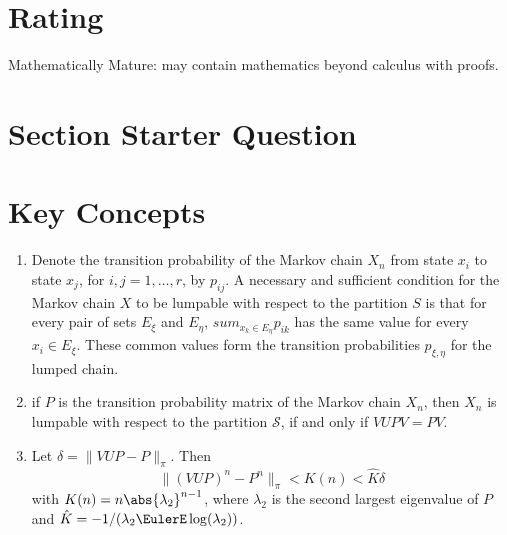 \documentclass[12pt]{article}
\begin{document}
\myheader
\mytitle

\hr


\hr

\usefirefox

\hr



\section*{Rating} %
Mathematically Mature: may contain mathematics beyond calculus with proofs.

\hr

\section*{Section Starter Question}

\hr

\section*{Key Concepts}

\begin{enumerate}
  \item Denote the transition probability
of the Markov chain $X_n$ from state $x_i$ to state $x_j$, for \( i, j
= 1, \dots,  r\), by \( p_{ij} \).  A 
necessary and sufficient condition for the Markov chain $X$ to be lumpable
with respect to the partition $S$ is that for every pair of sets
$E_{\xi}$ and $E_{\eta}$, \( sum_{x_k \in E_{\eta}} p_{ik} \) has the
same value for every \(x_i \in E_{\xi} \). These common values form
the transition probabilities $p_{\xi, \eta}$ for the lumped chain.
  \item   if $P$ is the transition probability matrix of the Markov chain
$X_n$, then $X_n$ is lumpable with respect to the partition $\mathcal{S}$, if and only if
\( VUPV = PV \).
  \item   Let $ \delta = \| VUP - P \|_{\pi}$.  Then
  \[
    \| (VUP)^n - P^n \|_{\pi} < K(n) < \hat{K} \delta
  \]
  with $K(n) = n \abs{\lambda_2}^{n-1}$, where $\lambda_2$ is the
  second largest eigenvalue of $P$ and $\hat{K} = -1/(\lambda_2
  \EulerE \log(\lambda_2))$.
\end{enumerate}
\end{document}
